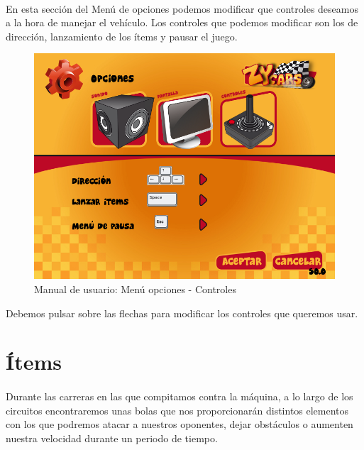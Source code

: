 \paragraph{}
En esta sección del Menú de opciones podemos modificar que controles deseamos a la hora de manejar el vehículo. Los 
controles que podemos modificar son los de dirección, lanzamiento de los ítems y pausar el juego.

\begin{figure}[H]
  \label{menu_controles}
  \begin{center}
    \includegraphics[scale=0.4]{imagenes/capturas/menuopcionescontroles.png}
  \end{center}
 \caption{Manual de usuario: Menú opciones - Controles}
\end{figure}

Debemos pulsar sobre las flechas para modificar los controles que queremos usar.

\section{Ítems}

\paragraph{}
Durante las carreras en las que compitamos contra la máquina, a lo largo de los circuitos encontraremos unas bolas que nos
proporcionarán distintos elementos con los que podremos atacar a nuestros oponentes, dejar obstáculos o aumenten nuestra velocidad
durante un periodo de tiempo.


